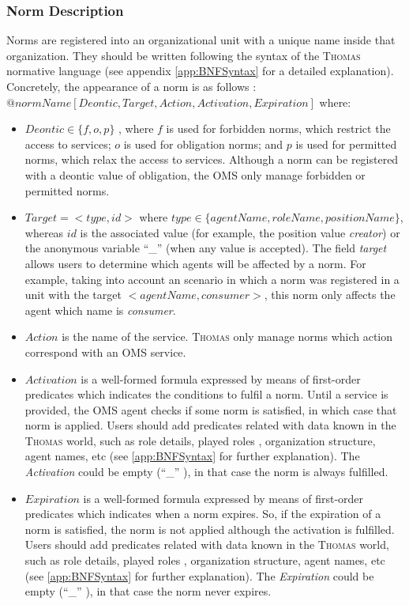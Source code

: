 \subsubsection{Norm Description}
Norms are registered into an organizational unit with a unique name inside that organization. They should be written following the syntax of the \textsc{Thomas} normative language (see appendix \ref{app:BNFSyntax} for a detailed explanation). Concretely, the appearance of a norm is as follows : \\
$@normName[Deontic, Target, Action, Activation, Expiration]$ where:
\begin{itemize}
 \item $Deontic \in \lbrace f,o,p \rbrace$ , where $f$ is used for forbidden norms, which restrict the access to services; $o$ is used for obligation norms; and $p$ is used for permitted norms, which relax the access to services. Although a norm can be registered with a deontic value  of obligation, the OMS only manage forbidden or permitted norms. 	
 \item $Target=<type,id>$ where $type \in   \lbrace agentName, roleName, positionName \rbrace $, whereas $id$ is the associated value (for example, the position value \textit{creator}) or the anonymous variable ``\_'' (when any value is accepted).  The field \textit{target} allows users to determine which agents will be affected by a norm. For example, taking into account an scenario in which a norm was registered in a unit with the target $<agentName, consumer>$, this norm only affects the agent which name is \textit{consumer}. 
 
 \item $Action$ is the name of the service. \textsc{Thomas} only manage norms which action correspond with an OMS service.
 
 \item $Activation$ is a well-formed formula expressed by means of first-order predicates which indicates the conditions to fulfil a norm. Until a service is provided, the OMS agent checks if some norm is satisfied, in which case that norm is applied. Users should add predicates related with data known in the \textsc{Thomas} world, such as role details, played roles , organization structure, agent names, etc (see \ref{app:BNFSyntax} for further explanation). The \textit{Activation}  could be empty (``\_'' ), in that case the norm is always fulfilled.
 
 \item  $Expiration$ is a well-formed formula expressed by means of first-order predicates which indicates when a norm expires. So, if the expiration of a norm is satisfied, the norm is not applied although the activation is fulfilled. Users should add predicates related with data known in the \textsc{Thomas} world, such as role details, played roles , organization structure, agent names, etc (see \ref{app:BNFSyntax} for further explanation). The  \textit{Expiration} could be empty (``\_'' ), in that case the norm never expires.
 
\end{itemize}

